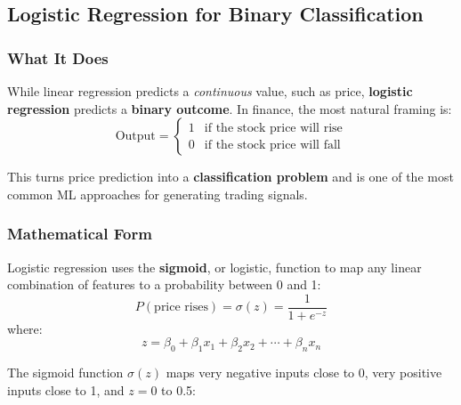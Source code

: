 \documentclass[12pt,openany]{book}
\begin{document}
\subsection{Logistic Regression for Binary Classification}

\subsubsection{What It Does}

While linear regression predicts a \textit{continuous} value, such as price, \textbf{logistic regression} predicts a \textbf{binary outcome}. In finance, the most natural framing is:
\begin{equation*}
    \text{Output} =
    \begin{cases}
        1 & \text{if the stock price will rise} \\
        0 & \text{if the stock price will fall}
    \end{cases}
\end{equation*}

This turns price prediction into a \textbf{classification problem} and is one of the most common ML approaches for generating trading signals.

\subsubsection{Mathematical Form}

Logistic regression uses the \textbf{sigmoid}, or logistic, function to map any linear combination of features to a probability between 0 and 1:
\begin{equation*}
    P(\text{price rises}) = \sigma(z) = \frac{1}{1 + e^{-z}}
\end{equation*}
where:
\begin{equation*}
    z = \beta_0 + \beta_1 x_1 + \beta_2 x_2 + \cdots + \beta_n x_n
\end{equation*}

The sigmoid function \(\sigma(z)\) maps very negative inputs close to 0, very positive inputs close to 1, and \(z = 0\) to 0.5:

\begin{center}
\end{center}
\end{document}

